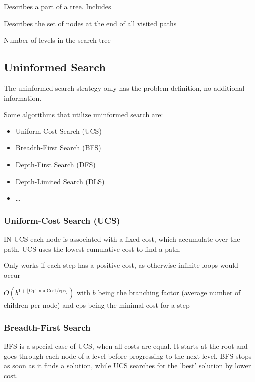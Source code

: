 \documentclass[
../../EiKI_Summary.tex,
]
{subfiles}
\begin{document}
\begin{defbox}
    [Node]
    Describes a part of a tree. Includes 
\end{defbox}

\begin{defbox}
    [Fringe]
    Describes the set of nodes at the end of all visited paths
\end{defbox}

\begin{defbox}
    [Depth]
    Number of levels in the search tree
\end{defbox}

\subsection{Uninformed Search}
\begin{defbox}
    [Definition]
    The uninformed search strategy only has the problem definition, no additional information. 

    Some algorithms that utilize uninformed search are:
    \begin{itemize}
        \item Uniform-Cost Search (UCS)
        \item Breadth-First Search (BFS)
        \item Depth-First Search (DFS)
        \item Depth-Limited Search (DLS)
        \item \dots
    \end{itemize}
\end{defbox}

\subsubsection{Uniform-Cost Search (UCS)}
IN UCS each node is associated with a fixed cost, which accumulate over the path. UCS uses the lowest cumulative cost to find a path.

Only works if each step has a positive cost, as otherwise infinite loops would occur

 $O(b^{1 + \lfloor \text{OptimalCost} / \text{eps}\rfloor})$ with $b$ being the branching factor (average number of children per node) and eps being the minimal cost for a step

\subsubsection{Breadth-First Search}
BFS is a special case of UCS, when all costs are equal. It starts at the root and goes through each node of a level before progressing to the next level. BFS stops as soon as it finds a solution, while UCS searches for the 'best' solution by lower cost.
\end{document}
